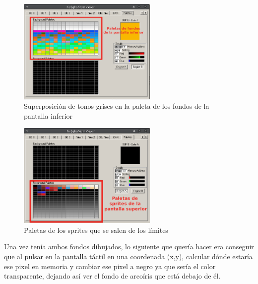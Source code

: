 \vspace{0.5cm}

\begin{figure}[htbp]
\centering
  \includegraphics[width=0.6\textwidth]{archivos/palettes_bg_sub_overwritten.png}
  \caption{Superposición de tonos grises en la paleta de los fondos de la pantalla inferior}
  \label{fig:palettes_bg_sub_overwritten}
\end{figure}

\vspace{0.5cm}

\begin{figure}[htbp]
\centering
  \includegraphics[width=0.6\textwidth]{archivos/palette_sprites_overflow.png}
  \caption{Paletas de los sprites que se salen de los límites}
  \label{fig:palette_sprites_overflow}
\end{figure}

\vspace{0.5cm}

Una vez tenía ambos fondos dibujados, lo siguiente que quería hacer era conseguir que al pulsar en la pantalla táctil en una coordenada (x,y), calcular dónde estaría ese pixel en memoria y cambiar ese pixel a negro ya que sería el color transparente, dejando así ver el fondo de arcoíris que está debajo de él.

\vspace{0.5cm}

